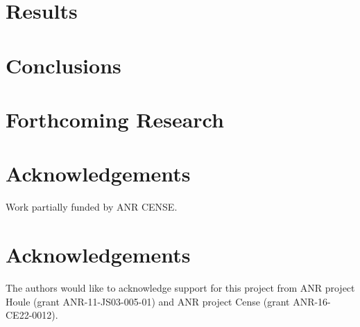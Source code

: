 \documentclass[a0,portrait,15pt]{a0poster}
\begin{document}
\begin{multicols}{2}
\section*{}


\section*{Results}



\color{SaddleBrown} %

\section*{Conclusions}



\color{DarkSlateGray} %


\section*{Forthcoming Research}

\section*{Acknowledgements}

Work partially funded by ANR CENSE.




\section*{Acknowledgements}


The authors would like to acknowledge support for this project
from ANR project Houle (grant ANR-11-JS03-005-01) and ANR project Cense (grant ANR-16-CE22-0012).


\end{multicols}
\end{document}
